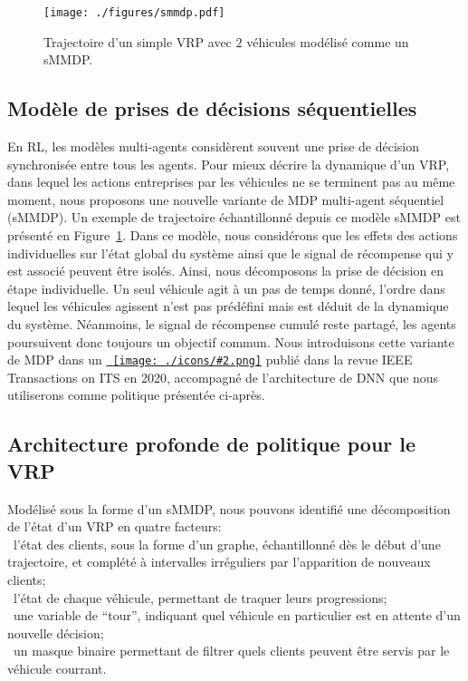 \documentclass[a4paper, 11pt]{article}
\newcommand{\useicon}[2][8pt]{\texttt{[image: ./icons/\#2.png]}}
\newcommand{\jumpto}[2]{\hyperref[#2]{\color{cyan!70!black}{#1}~\useicon{jump}}}
\begin{document}
    \begin{figure}[h]
        \centering
        \texttt{[image: ./figures/smmdp.pdf]}
        \caption{Trajectoire d'un simple VRP avec $2$ v{\'e}hicules mod{\'e}lis{\'e} comme un sMMDP.}
        \label{fig:smmdp}
    \end{figure}

    \subsection*{Mod{\`e}le de prises de d{\'e}cisions s{\'e}quentielles}
    \hspace{7mm}En RL, les mod{\`e}les multi-agents consid{\`e}rent souvent une prise de d{\'e}cision synchronis{\'e}e entre tous les agents.
    Pour mieux d{\'e}crire la dynamique d'un VRP, dans lequel les actions entreprises par les v{\'e}hicules ne se terminent pas au m{\^e}me moment,
    nous proposons une nouvelle variante de MDP multi-agent s{\'e}quentiel (sMMDP).
    Un exemple de trajectoire {\'e}chantillonn{\'e} depuis ce mod{\`e}le sMMDP est pr{\'e}sent{\'e} en Figure~\ref{fig:smmdp}.
    Dans ce mod{\`e}le, nous consid{\'e}rons que les effets des actions individuelles sur l'{\'e}tat global du syst{\`e}me
    ainsi que le signal de r{\'e}compense qui y est associ{\'e} peuvent {\^e}tre isol{\'e}s.
    Ainsi, nous d{\'e}composons la prise de d{\'e}cision en {\'e}tape individuelle.
    Un seul v{\'e}hicule agit {\`a} un pas de temps donn{\'e}, l'ordre dans lequel les v{\'e}hicules agissent n'est pas pr{\'e}d{\'e}fini
    mais est d{\'e}duit de la dynamique du syst{\`e}me.
    N{\'e}anmoins, le signal de r{\'e}compense cumul{\'e} reste partag{\'e}, les agents poursuivent donc toujours un objectif commun.
    Nous introduisons cette variante de MDP dans un \jumpto{article}{ref:trans:its} publi{\'e} dans la revue IEEE Transactions on ITS en 2020,
    accompagn{\'e} de l'architecture de DNN que nous utiliserons comme politique pr{\'e}sent{\'e}e ci-apr{\`e}s.

    \subsection*{Architecture profonde de politique pour le VRP}
    \hspace{7mm}Mod{\'e}lis{\'e} sous la forme d'un sMMDP, nous pouvons identifi{\'e} une d{\'e}composition de l'{\'e}tat d'un VRP en quatre facteurs: \\
    \textbullet~l'{\'e}tat des clients, sous la forme d'un graphe, {\'e}chantillonn{\'e} d{\`e}s le d{\'e}but d'une trajectoire,
        et compl{\'e}t{\'e} {\`a} intervalles irr{\'e}guliers par l'apparition de nouveaux clients; \\
    \textbullet~l'{\'e}tat de chaque v{\'e}hicule, permettant de traquer leurs progressions; \\
    \textbullet~une variable de ``tour'', indiquant quel v{\'e}hicule en particulier est en attente d'un nouvelle d{\'e}cision; \\
    \textbullet~un masque binaire permettant de filtrer quels clients peuvent {\^e}tre servis par le v{\'e}hicule courrant.
\end{document}
